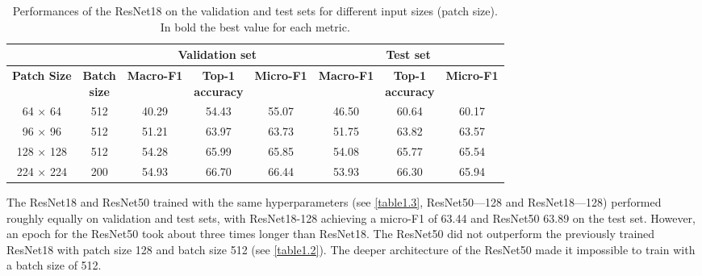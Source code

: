 \begin{table}[htbp]
  \centering
  \normalsize
  \caption[Performances of the ResNet18 on the validation and test sets for different input sizes]{Performances of the ResNet18 on the validation and test sets for different input sizes (patch size). In bold the best value for each metric.}
  \label{table1.2}
    \begin{tabular}{*{2}{c}|*{3}{c}|*{3}{c}}
        \toprule
        \multicolumn{2}{c}{\textbf{}}             & \multicolumn{3}{c}{\textbf{Validation set}}                     & \multicolumn{3}{c}{\textbf{Test set}}                           \\ 
        \midrule
        \textbf{Patch Size} & \makecell{\textbf{Batch} \\ \textbf{size}} & \textbf{Macro-F1} & \makecell{\textbf{Top-1} \\ \textbf{accuracy}} & \textbf{Micro-F1} & \textbf{Macro-F1} & \makecell{\textbf{Top-1} \\ \textbf{accuracy}} & \textbf{Micro-F1} \\ \midrule
        64 × 64             & 512                 & 40.29             & 54.43                   & 55.07             & 46.50             & 60.64                   & 60.17             \\
        96 × 96             & 512                 & 51.21             & 63.97                   & 63.73             & 51.75             & 63.82                   & 63.57             \\
        128 × 128           & 512                 & 54.28             & 65.99                   & 65.85             & 54.08             & 65.77                   & 65.54             \\
        224 × 224           & 200                 & 54.93             & 66.70                   & 66.44             & 53.93             & 66.30                   & 65.94             \\ \bottomrule
    \end{tabular}
\end{table}

The ResNet18 and ResNet50 trained with the same hyperparameters  (see \autoref{table1.3}, ResNet50---128 and ResNet18---128) performed roughly equally on validation and test sets, with ResNet18-128 achieving a micro-F1 of 63.44 and ResNet50 63.89 on the test set. However, an epoch for the ResNet50 took about three times longer than ResNet18. The ResNet50 did not outperform the previously trained ResNet18 with patch size 128 and batch size 512 (see \autoref{table1.2}). The deeper architecture of the ResNet50 made it impossible to train with a batch size of 512.

